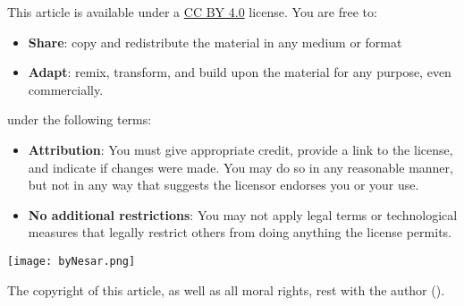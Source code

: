 \begingroup
\tiny\raggedright\noindent
This article is available under a \href{https://creativecommons.org/licenses/by/4.0/}{CC BY 4.0} license. You are free to: 
\begin{itemize}[leftmargin=0.35cm,parsep=0pt,itemsep=0pt]
\item \textbf{Share}: copy and redistribute the material in any medium or format
\item \textbf{Adapt}: remix, transform, and build upon the material for any purpose, even commercially.
\end{itemize}
\noindent under the following terms:
\begin{itemize}[leftmargin=0.35cm,parsep=0pt,itemsep=0pt]
\item \textbf{Attribution}: You must give appropriate credit, provide a link to the license, and indicate if changes were made. You may do so in any reasonable manner, but not in any way that suggests the licensor endorses you or your use.
\item \textbf{No additional restrictions}: You may not apply legal terms or technological measures that legally restrict others from doing anything the license permits.
\end{itemize}\smallskip

\begin{center}
\texttt{[image: byNesar.png]}
\end{center}\smallskip

\tiny\noindent The copyright of this article, as well as all moral rights, rest with the author (\theauthor{}).\vfill

\endgroup
